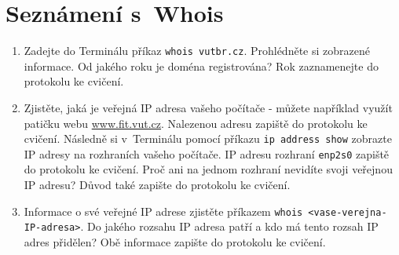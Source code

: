 \section{Seznámení s~Whois}
\begin{enumerate}
    \item Zadejte do Terminálu příkaz \texttt{whois vutbr.cz}. Prohlédněte si zobrazené informace. Od jakého roku je doména registrována? Rok zaznamenejte do protokolu ke cvičení.
    \item Zjistěte, jaká je veřejná IP adresa vašeho počítače - můžete například využít patičku webu \url{www.fit.vut.cz}. Nalezenou adresu zapiště do protokolu ke cvičení. Následně si v~Terminálu pomocí příkazu \texttt{ip address show} zobrazte IP adresy na rozhraních vašeho počítače. IP adresu rozhraní \texttt{enp2s0} zapiště do protokolu ke cvičení. Proč ani na jednom rozhraní nevidíte svoji veřejnou IP adresu? Důvod také zapište do protokolu ke cvičení.
    \item Informace o své veřejné IP adrese zjistěte příkazem \texttt{whois <vase-verejna-IP-adresa>}. Do jakého rozsahu IP adresa patří a kdo má tento rozsah IP adres přidělen? Obě informace zapište do protokolu ke cvičení.
\end{enumerate}


